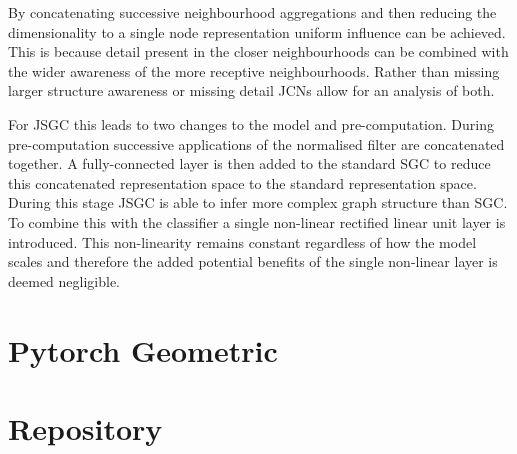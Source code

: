 By concatenating successive neighbourhood aggregations and then reducing the dimensionality to a single node representation uniform influence can be achieved.
This is because detail present in the closer neighbourhoods can be combined with the wider awareness of the more receptive neighbourhoods.
Rather than missing larger structure awareness or missing detail JCNs allow for an analysis of both.

For JSGC this leads to two changes to the model and pre-computation.
During pre-computation successive applications of the normalised filter are concatenated together.
A fully-connected layer is then added to the standard SGC to reduce this concatenated representation space to the standard representation space.
During this stage JSGC is able to infer more complex graph structure than SGC.
To combine this with the classifier a single non-linear rectified linear unit layer is introduced.
This non-linearity remains constant regardless of how the model scales and therefore the added potential benefits of the single non-linear layer is deemed negligible.

\section{Pytorch Geometric}

\section{Repository}
